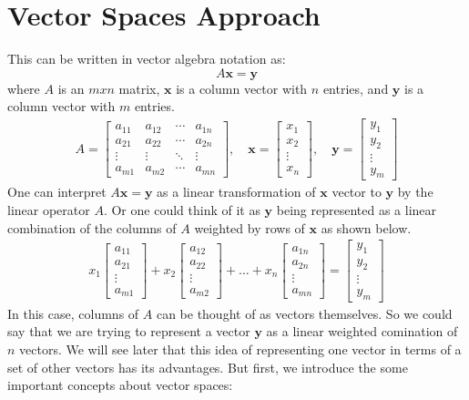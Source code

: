 \section{Vector Spaces Approach}	
This can be written in vector algebra notation as:
	\[ A\mathbf{x}=\mathbf{y} \]
where \(A\) is an \(mxn\) matrix, \(\mathbf{x}\) is a column vector with \(n\) entries, and \(\mathbf{y}\) is a column vector with \(m\) entries.
	\begin{align*}
	A=
	\begin{bmatrix}
	a_{11} & a_{12} & \cdots & a_{1n} \\
	a_{21} & a_{22} & \cdots & a_{2n} \\
	\vdots & \vdots & \ddots & \vdots \\
	a_{m1} & a_{m2} & \cdots & a_{mn}
	\end{bmatrix},\quad
	\mathbf{x}=
	\begin{bmatrix}
	x_1 \\
	x_2 \\
	\vdots \\
	x_n
	\end{bmatrix},\quad
	\mathbf{y}=
	\begin{bmatrix}
	y_1 \\
	y_2 \\
	\vdots \\
	y_m
	\end{bmatrix}
	\end{align*}
One can interpret  \( A\mathbf{x}=\mathbf{y} \) as a linear transformation of \(\mathbf{x}\) vector to \(\mathbf{y}\) by the linear operator \(A\). Or one could think of it as \(\mathbf{y}\) being represented as a linear combination of the columns of \(A\) weighted by rows of \(\mathbf{x}\) as shown below.
	\begin{align*}
		x_1\begin{bmatrix} a_{11}\\ a_{21}\\ \vdots\\ a_{m1} \end{bmatrix} + x_2\begin{bmatrix} a_{12}\\ a_{22}\\ \vdots\\ a_{m2} \end{bmatrix} + \hdots + x_n\begin{bmatrix} a_{1n}\\ a_{2n}\\ \vdots\\ a_{mn} \end{bmatrix}
		= \begin{bmatrix} y_1\\ y_2\\ \vdots\\ y_m \end{bmatrix}
	\end{align*}
In this case, columns of \(A\) can be thought of as vectors themselves. So we could say that we are trying to represent a vector \(\mathbf{y}\) as a linear weighted comination of \(n\) vectors. We will see later that this idea of representing one vector in terms of a set of other vectors has its advantages. But first, we introduce the some important concepts about vector spaces:
	

